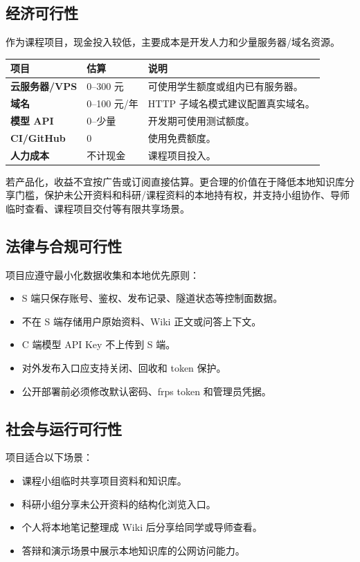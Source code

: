 \documentclass[UTF8,a4paper,12pt,fontset=fandol]{ctexart}
\begin{document}
\subsection{经济可行性}
作为课程项目，现金投入较低，主要成本是开发人力和少量服务器/域名资源。

\begin{longtable}{>{\bfseries}p{3.6cm}p{3.0cm}p{7.6cm}}
\toprule
项目 & 估算 & 说明 \\
\midrule
云服务器/VPS & 0--300 元 & 可使用学生额度或组内已有服务器。 \\
域名 & 0--100 元/年 & HTTP 子域名模式建议配置真实域名。 \\
模型 API & 0--少量 & 开发期可使用测试额度。 \\
CI/GitHub & 0 & 使用免费额度。 \\
人力成本 & 不计现金 & 课程项目投入。 \\
\bottomrule
\end{longtable}

若产品化，收益不宜按广告或订阅直接估算。更合理的价值在于降低本地知识库分享门槛，保护未公开资料和科研/课程资料的本地持有权，并支持小组协作、导师临时查看、课程项目交付等有限共享场景。

\subsection{法律与合规可行性}
项目应遵守最小化数据收集和本地优先原则：
\begin{itemize}
  \item S 端只保存账号、鉴权、发布记录、隧道状态等控制面数据。
  \item 不在 S 端存储用户原始资料、Wiki 正文或问答上下文。
  \item C 端模型 API Key 不上传到 S 端。
  \item 对外发布入口应支持关闭、回收和 token 保护。
  \item 公开部署前必须修改默认密码、frps token 和管理员凭据。
\end{itemize}

\subsection{社会与运行可行性}
项目适合以下场景：
\begin{itemize}
  \item 课程小组临时共享项目资料和知识库。
  \item 科研小组分享未公开资料的结构化浏览入口。
  \item 个人将本地笔记整理成 Wiki 后分享给同学或导师查看。
  \item 答辩和演示场景中展示本地知识库的公网访问能力。
\end{itemize}
\end{document}
